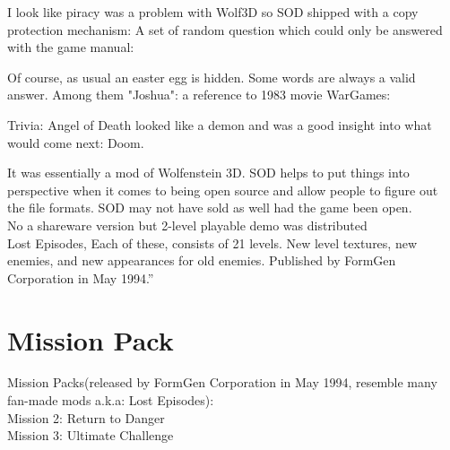 \documentclass[book.tex]{subfiles}
\begin{document}
   \par
\begin{figure}[H]
\centering
 \end{figure}
 \par


 I look like piracy was a problem with Wolf3D so SOD shipped with a copy protection mechanism: A set of random question which could only be answered with the game manual:\\
    \par
\begin{figure}[H]
\centering
 \end{figure}
 \par
 Of course, as usual an easter egg is hidden. Some words are always a valid answer. Among them "Joshua": a reference to 1983 movie WarGames:\\
    \par
\begin{figure}[H]
\centering
 \end{figure}
 \par



Trivia: Angel of Death looked like a demon and was a good insight into what would come next: Doom.




It was essentially a mod of Wolfenstein 3D. SOD helps to put things into perspective when it comes to being open source and allow people to figure out the file formats. SOD may not have sold as well had the game been open.\\
No a shareware version  but  2-level playable demo was distributed\\
Lost Episodes, Each of these, consists of 21 levels. New level textures, new enemies, and new appearances for old enemies. Published by FormGen Corporation in May 1994.''
\\
\section{Mission Pack}
Mission Packs(released by FormGen Corporation in May 1994, resemble many fan-made mods a.k.a: Lost Episodes):\\
Mission 2: Return to Danger\\
Mission 3: Ultimate Challenge\\
\end{document}
